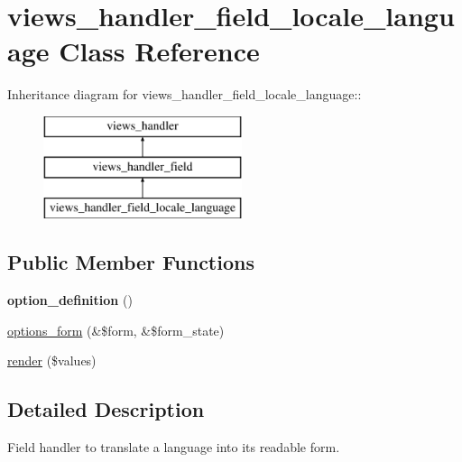 \hypertarget{classviews__handler__field__locale__language}{
\section{views\_\-handler\_\-field\_\-locale\_\-language Class Reference}
\label{classviews__handler__field__locale__language}
}
Inheritance diagram for views\_\-handler\_\-field\_\-locale\_\-language::\begin{figure}[H]
\begin{center}
\leavevmode
\includegraphics[height=3cm]{classviews__handler__field__locale__language}
\end{center}
\end{figure}
\subsection*{Public Member Functions}
\begin{DoxyCompactItemize}
\item 
\hypertarget{classviews__handler__field__locale__language_a5ac1ed2ef4404cdf9c6ffc436c14166b}{
{\bfseries option\_\-definition} ()}
\label{classviews__handler__field__locale__language_a5ac1ed2ef4404cdf9c6ffc436c14166b}

\item 
\hyperlink{classviews__handler__field__locale__language_ae1a402a2c1186b055d66d6421d10182c}{options\_\-form} (\&\$form, \&\$form\_\-state)
\item 
\hyperlink{classviews__handler__field__locale__language_a9aee281e240225b4a6f4465afcb8cdbf}{render} (\$values)
\end{DoxyCompactItemize}


\subsection{Detailed Description}
Field handler to translate a language into its readable form. 

